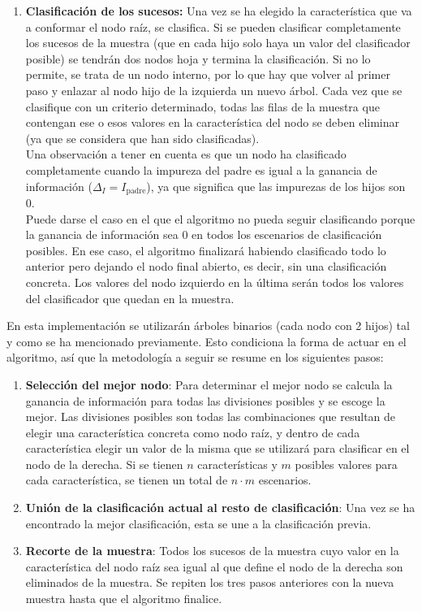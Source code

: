 \documentclass[12pt]{report}\usepackage[]{graphicx}\usepackage[dvipsnames]{xcolor}
\begin{document}
\begin{enumerate}[label = \textbf{\arabic*.}]
	 				\item \textbf{Clasificación de los sucesos:} Una vez se ha elegido la característica que va a conformar el nodo raíz, se clasifica. Si se pueden clasificar completamente los sucesos de la muestra (que en cada hijo solo haya un valor del clasificador posible) se tendrán dos nodos hoja y termina la clasificación. Si no lo permite, se trata de un nodo interno, por lo que hay que volver al primer paso y enlazar al nodo hijo de la izquierda un nuevo árbol. Cada vez que se clasifique con un criterio determinado, todas las filas de la muestra que contengan ese o esos valores en la característica del nodo se deben eliminar (ya que se considera que han sido clasificadas). \\
	 				
	 				Una observación a tener en cuenta es que un nodo ha clasificado completamente cuando la impureza del padre es igual a la ganancia de información ($\Delta_I = I_{\text{padre}}$), ya que significa que las impurezas de los hijos son 0. \\
	 				
	 				Puede darse el caso en el que el algoritmo no pueda seguir clasificando porque la ganancia de información sea 0 en todos los escenarios de clasificación posibles. En ese caso, el algoritmo finalizará habiendo clasificado todo lo anterior pero dejando el nodo final abierto, es decir, sin una clasificación concreta. Los valores del nodo izquierdo en la última serán todos los valores del clasificador que quedan en la muestra.
	 			\end{enumerate}
	 			
	 			En esta implementación se utilizarán árboles binarios (cada nodo con 2 hijos) tal y como se ha mencionado previamente. Esto condiciona la forma de actuar en el algoritmo, así que la metodología a seguir se resume en los siguientes pasos:
	 			
	 			\begin{enumerate}[label = \textbf{\arabic*.}]
	 				\item \textbf{Selección del mejor nodo}: Para determinar el mejor nodo se calcula la ganancia de información para todas las divisiones posibles y se escoge la mejor. Las divisiones posibles son todas las combinaciones que resultan de elegir una característica concreta como nodo raíz, y dentro de cada característica elegir un valor de la misma que se utilizará para clasificar en el nodo de la derecha. Si se tienen $n$ características y $m$ posibles valores para cada característica, se tienen un total de $n \cdot m$ escenarios. 
	 				\item \textbf{Unión de la clasificación actual al resto de clasificación}: Una vez se ha encontrado la mejor clasificación, esta se une a la clasificación previa.
	 				\item \textbf{Recorte de la muestra}: Todos los sucesos de la muestra cuyo valor en la característica del nodo raíz sea igual al que define el nodo de la derecha son eliminados de la muestra. Se repiten los tres pasos anteriores con la nueva muestra hasta que el algoritmo finalice.
	 			\end{enumerate}
	 			
\end{document}
